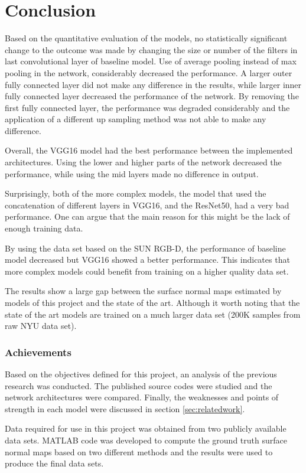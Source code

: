 \chapter{Conclusion}

Based on the quantitative evaluation of the models, no statistically significant change to the outcome was made by changing the size or number of the filters in last convolutional layer of baseline model. Use of average pooling instead of max pooling in the network, considerably decreased the performance. A larger outer fully connected layer did not make any difference in the results, while larger inner fully connected layer decreased the performance of the network. By removing the first fully connected layer, the performance was degraded considerably and the application of a different up sampling method was not able to make any difference.

Overall, the VGG16 model had the best performance between the implemented architectures. Using the lower and higher parts of the network decreased the performance, while using the mid layers made no difference in output. 

Surprisingly, both of the more complex models, the model that used the concatenation of different layers in VGG16, and the ResNet50, had a very bad performance. One can argue that the main reason for this might be the lack of enough training data.

By using the data set based on the SUN RGB-D, the performance of baseline model decreased but VGG16 showed a better performance. This indicates that more complex models could benefit from training on a higher quality data set.

The results show a large gap between the surface normal maps estimated by models of this project and the state of the art. Although it worth noting that the state of the art models are trained on a much larger data set (200K samples from raw NYU data set). 

\subsection{Achievements}

Based on the objectives defined for this project, an analysis of the previous research was conducted. The published source codes were studied and the network architectures were compared. Finally, the weaknesses and points of strength in each model were discussed in section \ref{sec:relatedwork}. 

Data required for use in this project was obtained from two publicly available data sets. MATLAB code was developed to compute the ground truth surface normal maps based on two different methods and the results were used to produce the final data sets. 


